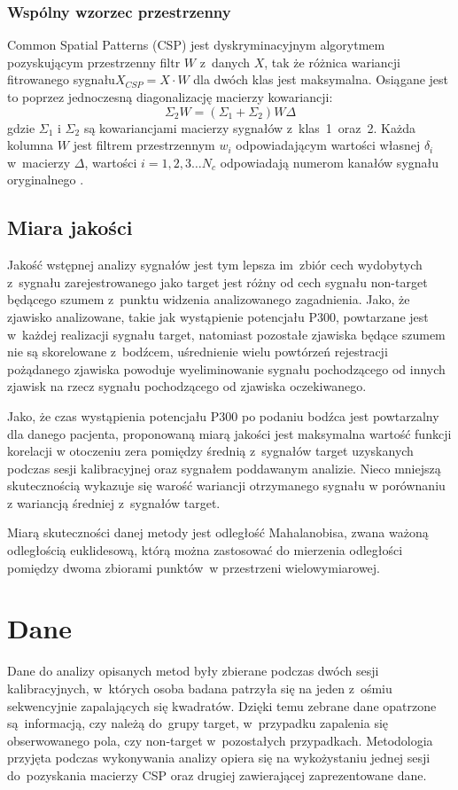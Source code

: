 \documentclass[licencjacka,openright]{pracamgr}
\begin{document}
\subsection{Wspólny wzorzec przestrzenny}
Common Spatial Patterns (CSP) jest dyskryminacyjnym algorytmem pozyskującym przestrzenny filtr $W$ z~danych $X$, tak że różnica wariancji fitrowanego sygnału\mbox{$X_{CSP} = X \cdot W$} dla dwóch klas jest maksymalna. Osiągane jest to poprzez jednoczesną diagonalizację macierzy kowariancji:
\begin{equation}
\Sigma _2 W = (\Sigma _1 + \Sigma _2 )W \Delta
\end{equation}
gdzie $\Sigma_1$ i $\Sigma_2$ są kowariancjami macierzy sygnałów z~klas~1~oraz~2. Każda kolumna $W$ jest filtrem przestrzennym $w_i$ odpowiadającym wartości własnej $\delta _i$ w~macierzy $\Delta$, wartości $i = 1,2,3 \ldots N_c$ odpowiadają numerom kanałów sygnału oryginalnego \citep{sannelli2011}.

\section{Miara jakości}
Jakość wstępnej analizy sygnałów jest tym lepsza im~zbiór cech wydobytych z~sygnału zarejestrowanego jako target jest różny od cech sygnału non-target będącego szumem z~punktu widzenia analizowanego zagadnienia. Jako, że zjawisko analizowane, takie jak wystąpienie potencjału P300, powtarzane jest w~każdej realizacji sygnału target, natomiast pozostałe zjawiska będące szumem nie są skorelowane z~bodźcem, uśrednienie wielu powtórzeń rejestracji pożądanego zjawiska powoduje wyeliminowanie sygnału pochodzącego od innych zjawisk na rzecz sygnału pochodzącego od zjawiska oczekiwanego.

Jako, że czas wystąpienia potencjału P300 po podaniu bodźca jest powtarzalny dla danego pacjenta, proponowaną miarą jakości jest maksymalna wartość funkcji korelacji w otoczeniu zera pomiędzy średnią z~sygnałów target uzyskanych podczas sesji kalibracyjnej oraz sygnałem poddawanym analizie. Nieco mniejszą skutecznością wykazuje się warość wariancji otrzymanego sygnału w porównaniu z wariancją średniej z~sygnałów target.

Miarą skuteczności danej metody jest odległość Mahalanobisa, zwana ważoną odległością euklidesową, którą można zastosować do mierzenia odległości pomiędzy dwoma zbiorami punktów~w przestrzeni wielowymiarowej.

\chapter{Dane}
Dane do analizy opisanych metod były zbierane podczas dwóch sesji kalibracyjnych, w~których osoba badana patrzyła się na jeden z~ośmiu sekwencyjnie zapalających się kwadratów. Dzięki temu zebrane dane opatrzone są~informacją, czy należą do~grupy target, w~przypadku zapalenia się obserwowanego pola, czy non-target w~pozostałych przypadkach. Metodologia przyjęta podczas wykonywania analizy opiera się na wykożystaniu jednej sesji do~pozyskania macierzy CSP oraz drugiej zawierającej zaprezentowane dane.
\end{document}
